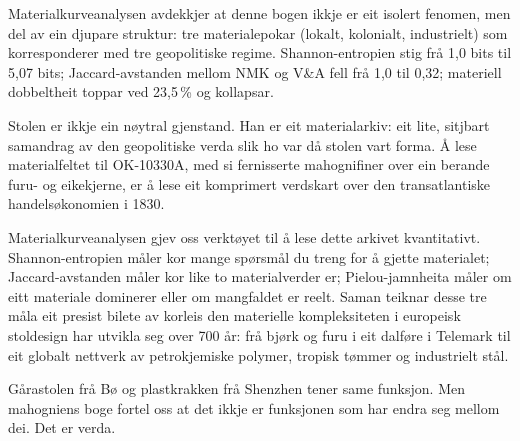 \documentclass[10pt, a4paper, twocolumn]{article}
\begin{document}
Materialkurveanalysen avdekkjer at denne bogen ikkje er eit isolert fenomen, men del av ein djupare struktur: tre materialepokar (lokalt, kolonialt, industrielt) som korresponderer med tre geopolitiske regime. Shannon-entropien stig frå 1,0 bits til 5,07 bits; Jaccard-avstanden mellom NMK og V\&A fell frå 1,0 til 0,32; materiell dobbeltheit toppar ved 23,5\,\% og kollapsar.

Stolen er ikkje ein nøytral gjenstand. Han er eit materialarkiv: eit lite, sitjbart samandrag av den geopolitiske verda slik ho var då stolen vart forma. Å lese materialfeltet til OK-10330A, med si fernisserte mahognifiner over ein berande furu- og eikekjerne, er å lese eit komprimert verdskart over den transatlantiske handelsøkonomien i 1830.

Materialkurveanalysen gjev oss verktøyet til å lese dette arkivet kvantitativt. Shannon-entropien måler kor mange spørsmål du treng for å gjette materialet; Jaccard-avstanden måler kor like to materialverder er; Pielou-jamnheita måler om eitt materiale dominerer eller om mangfaldet er reelt. Saman teiknar desse tre måla eit presist bilete av korleis den materielle kompleksiteten i europeisk stoldesign har utvikla seg over 700 år: frå bjørk og furu i eit dalføre i Telemark til eit globalt nettverk av petrokjemiske polymer, tropisk tømmer og industrielt stål.

Gårastolen frå Bø og plastkrakken frå Shenzhen tener same funksjon. Men mahogniens boge fortel oss at det ikkje er funksjonen som har endra seg mellom dei. Det er verda.


\newpage
\onecolumn


\end{document}
